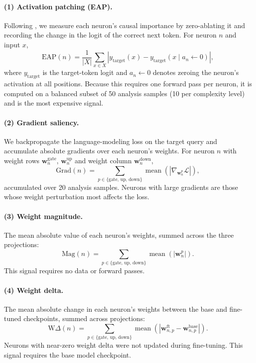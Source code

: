 \documentclass[11pt]{article}
\begin{document}
\paragraph{(1) Activation patching (EAP).}
Following \citet{syed2023attributionpatchingoutperformsautomated}, 
we measure each neuron's causal importance by zero-ablating it 
and recording the change in the logit of the correct next 
token. For neuron $n$ and input $x$,
\[
\text{EAP}(n) = \frac{1}{|X|} \sum_{x \in X} \left| y_{\text{target}}(x) - y_{\text{target}}(x \mid a_n \leftarrow 0) \right|,
\]
where $y_{\text{target}}$ is the target-token logit and 
$a_n \leftarrow 0$ denotes zeroing the neuron's activation at 
all positions. Because this requires one forward pass per 
neuron, it is computed on a balanced subset of 50 analysis 
samples (10 per complexity level) and is the most expensive 
signal.

\paragraph{(2) Gradient saliency.}
We backpropagate the language-modeling loss on the target 
query and accumulate absolute gradients over each neuron's 
weights. For neuron $n$ with weight rows 
$\mathbf{w}_n^{\text{gate}}$, $\mathbf{w}_n^{\text{up}}$ and 
weight column $\mathbf{w}_n^{\text{down}}$,
\[
\text{Grad}(n) = \sum_{p \in \{\text{gate, up, down}\}} \operatorname{mean}\!\left( \left| \nabla_{\mathbf{w}_n^{p}} \mathcal{L} \right| \right),
\]
accumulated over 20 analysis samples. Neurons with large 
gradients are those whose weight perturbation most affects the 
loss.

\paragraph{(3) Weight magnitude.}
The mean absolute value of each neuron's weights, summed across 
the three projections:
\[
\text{Mag}(n) = \sum_{p \in \{\text{gate, up, down}\}} \operatorname{mean}\!\left( \left| \mathbf{w}_n^{p} \right| \right).
\]
This signal requires no data or forward passes.

\paragraph{(4) Weight delta.}
The mean absolute change in each neuron's weights between the 
base and fine-tuned checkpoints, summed across projections:
\[
\text{W}\Delta(n) = \sum_{p \in \{\text{gate, up, down}\}} \operatorname{mean}\!\left( \left| \mathbf{w}_{n,p}^{\text{ft}} - \mathbf{w}_{n,p}^{\text{base}} \right| \right).
\]
Neurons with near-zero weight delta were not updated during 
fine-tuning. This signal requires the base model checkpoint.
\end{document}

